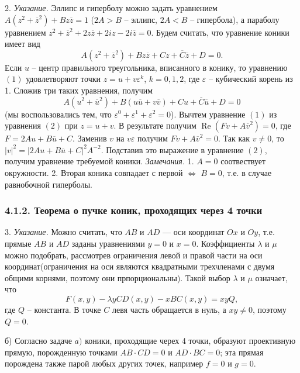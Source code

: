 2. \textit{Указание.} Эллипс и гиперболу можно задать уравнением $A(z^2 + \overline{z}^2) + Bz \overline{z} = 1$ ($2A > B $ -- эллипс, $2A < B$ -- гипербола), а параболу уравнением $z^2 + \overline{z}^2 + 2z \overline{z} + 2iz - 2i \overline{z} = 0$. Будем считать, что уравнение коники имеет вид
\begin{equation}
	A(z^2 + \overline{z}^2) + Bz \overline{z} + Cz + \overline{C} \overline{z} + D = 0.
\end{equation}
Если $u$ -- центр правильного треугольника, вписанного в конику, то уравнению $(1)$ удовлетворяют точки $z = u + v \varepsilon^k$, $k = 0, 1, 2$, где $\varepsilon$ -- кубический корень из 1. Сложив три таких уравнения, получим
\begin{equation}
	A(u^2 + \overline{u}^2) + B(u \overline{u} + v \overline{v}) + Cu + \overline{C} \overline{u} + D = 0
\end{equation}
(мы воспользовались тем, что $\varepsilon^0 + \varepsilon^1 + \varepsilon^2 = 0$). Вычтем уравнение $(1)$ из уравнения $(2)$ при $z = u + v$. В результате получим $\operatorname{Re}(Fv + A \overline{v}^2) = 0$, где $F = 2Au + B \overline{u} + C$. Заменив $v$ на $v\varepsilon$ получим $Fv + A\overline{v}^2 = 0$. Так как $v \ne 0$, то $|v|^2 = |2Au + B \overline{u} + C|^2 A^{-2}$. Подставив это выражение в уравнение $(2)$, получим уравнение требуемой коники. 
\textit{Замечания.} 1. $A = 0$ соотвествует окружности.
2. Вторая коника совпадает с первой $\Leftrightarrow$ $B = 0$, т.е. в случае равнобочной гиперболы.
\subsubsection*{4.1.2. Теорема о пучке коник, проходящих через 4 точки}
3. \textit{Указание.} Можно считать, что $AB$ и $AD$ — оси координат $Ox$ и $Oy$, т.е. прямые $AB$ и $AD$ заданы уравнениями $y = 0$ и $x = 0$. Коэффициенты $\lambda$ и $\mu$ можно подобрать, рассмотрев ограничения левой и правой части на оси координат(ограничения на оси являются квадратными трехчленами с двумя общими корнями, поэтому они прпорциональны). Такой выбор $\lambda$ и $\mu$ означает, что
\[
	F(x, y) - \lambda y CD(x, y) - xBC(x, y) = xyQ,
\]
где $Q$ -- константа. В точке $C$ левя часть обращается в нуль, а $xy \ne 0$, поэтому $Q = 0$.

б) Согласно задаче $a)$ коники, проходящие черех 4 точки, образуют проективную прямую, порожденную точками $AB \cdot CD = 0$ и $AD \cdot BC = 0$; эта прямая порождена также парой любых других точек, например $f = 0 $ и $g = 0$.

